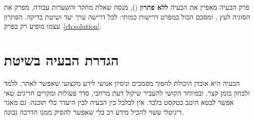 \begin{pcguide}
פרק הבעיה מאפיין את הבעיה \textbf{ללא פתרון} (), מנסח שאלת מחקר והשערות עבודה, מפרק את הסוגיה לעץ
, ומסכם הכול במפרט דרישות כמותי: לכל דרישה ערך יעד ושיטת בדיקה. הפתרון עצמו
מופיע רק בפרק~\ref{ch:solution}.
\end{pcguide}

\section{הגדרת הבעיה בשיטת }\label{sec:5w1h}
הבעיה היא אובדן היכולת להפוך מסמכים וניסיון אנושי לידע מקצועי שאפשר לאתר, ללמד ולבחון בזמן קצר, ובמיוחד הקושי
להעביר שיקול דעת מרחבי, סדר פעולות ומקרים חריגים שאי אפשר לבטא היטב בטקסט בלבד. אין לבלבל בין הבעיה לבין היעדר
כלי תוכנה: גם מאגר דיגיטלי עשוי להכיל מידע רב בלי שאפשר להסיק ממנו הדרכה נכונה.


